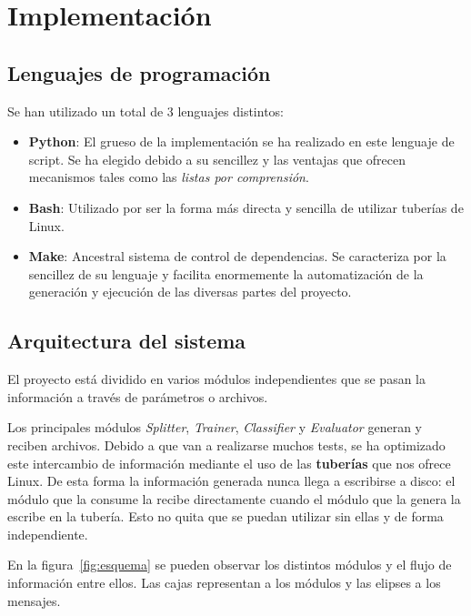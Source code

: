 \section{Implementación}

\subsection[Lenguajes]{Lenguajes de programación}

Se han utilizado un total de 3 lenguajes distintos:

\begin{itemize}
	\item \textbf{Python}: El grueso de la implementación se ha realizado en
		este lenguaje de script. Se ha elegido debido a su sencillez y
		las ventajas que ofrecen mecanismos tales como las \textit{listas por
		comprensión}.
	\item \textbf{Bash}: Utilizado por ser la forma más directa y sencilla
		de utilizar tuberías de Linux.
	\item \textbf{Make}: Ancestral sistema de control de dependencias. Se
		caracteriza por la sencillez de su lenguaje y facilita
		enormemente la automatización de la generación y ejecución de
		las diversas partes del proyecto.
\end{itemize}

\subsection[Arquitectura]{Arquitectura del sistema}

El proyecto está dividido en varios módulos independientes que se pasan la
información a través de parámetros o archivos.

Los principales módulos \textit{Splitter}, \textit{Trainer}, \textit{Classifier}
y \textit{Evaluator} generan y reciben archivos. Debido a que van a realizarse
muchos tests, se ha optimizado este intercambio de información mediante el uso
de las \textbf{tuberías} que nos ofrece Linux. De esta forma la información
generada nunca llega a escribirse a disco: el módulo que la consume la recibe
directamente cuando el módulo que la genera la escribe en la tubería. Esto no
quita que se puedan utilizar sin ellas y de forma independiente.

En la figura~\ref{fig:esquema} se pueden observar los distintos módulos y el
flujo de información entre ellos. Las cajas representan a los módulos y las
elipses a los mensajes.

